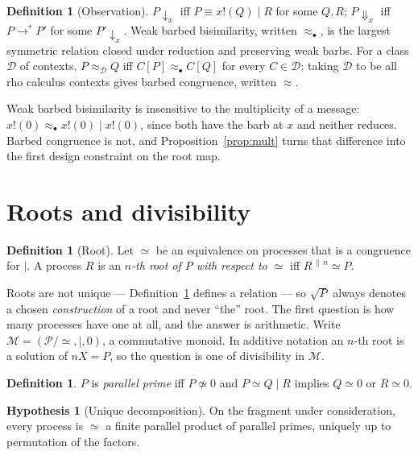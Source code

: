 \documentclass[11pt]{article}
\theoremstyle{definition}
\newtheorem{definition}[theorem]{Definition}
\newtheorem{hypothesis}[theorem]{Hypothesis}
\newcommand{\rhoc}{rho calculus}
\newcommand{\rt}[1]{\sqrt{#1}}
\newcommand{\barb}[1]{\downarrow_{#1}}
\newcommand{\wbarb}[1]{\Downarrow_{#1}}
\newcommand{\Proc}{\mathcal{P}}
\newcommand{\parn}[1]{{#1}^{\,\|\,n}}
\begin{document}
\begin{definition}[Observation]
$P \barb{x}$ iff $P \equiv x!(Q) \mid R$ for some $Q, R$; $P \wbarb{x}$ iff $P \longrightarrow^{*} P'$ for some $P' \barb{x}$. Weak barbed bisimilarity, written $\approx_{\bullet}$, is the largest symmetric relation closed under reduction and preserving weak barbs. For a class $\mathcal{D}$ of contexts, $P \approx_{\mathcal{D}} Q$ iff $C[P] \approx_{\bullet} C[Q]$ for every $C \in \mathcal{D}$; taking $\mathcal{D}$ to be all \rhoc{} contexts gives barbed congruence, written $\approx$.
\end{definition}

Weak barbed bisimilarity is insensitive to the multiplicity of a message: $x!(0) \approx_{\bullet} x!(0) \mid x!(0)$, since both have the barb at $x$ and neither reduces. Barbed congruence is not, and Proposition~\ref{prop:mult} turns that difference into the first design constraint on the root map.

\section{Roots and divisibility}\label{sec:div}

\begin{definition}[Root]\label{def:root}
Let $\simeq$ be an equivalence on processes that is a congruence for $\mid$. A process $R$ is an \emph{$n$-th root of $P$ with respect to $\simeq$} iff $\parn{R} \simeq P$.
\end{definition}

Roots are not unique --- Definition~\ref{def:root} defines a relation --- so $\rt{P}$ always denotes a chosen \emph{construction} of a root and never ``the'' root. The first question is how many processes have one at all, and the answer is arithmetic. Write $\mathcal{M} = (\Proc/{\simeq}, \mid, 0)$, a commutative monoid. In additive notation an $n$-th root is a solution of $nX = P$, so the question is one of divisibility in $\mathcal{M}$.

\begin{definition}
$P$ is \emph{parallel prime} iff $P \not\simeq 0$ and $P \simeq Q \mid R$ implies $Q \simeq 0$ or $R \simeq 0$.
\end{definition}

\begin{hypothesis}[Unique decomposition]\label{hyp:ud}
On the fragment under consideration, every process is $\simeq$ a finite parallel product of parallel primes, uniquely up to permutation of the factors.
\end{hypothesis}
\end{document}
